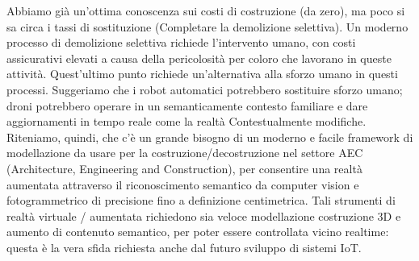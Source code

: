 Abbiamo già un'ottima conoscenza sui costi di costruzione (da zero), ma poco si sa circa i tassi di sostituzione
(Completare la demolizione selettiva). Un moderno processo di demolizione selettiva richiede l'intervento umano,
con costi assicurativi elevati a causa della pericolosità per coloro che lavorano in queste attività.
Quest'ultimo punto richiede un'alternativa alla sforzo umano in questi processi. Suggeriamo che i robot automatici
potrebbero sostituire sforzo umano; droni potrebbero operare in un semanticamente
contesto familiare e dare aggiornamenti in tempo reale come la realtà Contestualmente modifiche.
Riteniamo, quindi, che c'è un grande bisogno di un moderno e facile framework di modellazione da usare per la
costruzione/decostruzione nel settore AEC (Architecture, Engineering and Construction),
per consentire una realtà aumentata attraverso il riconoscimento semantico da computer vision e
fotogrammetrico di precisione fino a definizione centimetrica.
Tali strumenti di realtà virtuale / aumentata
richiedono sia veloce modellazione costruzione 3D e aumento di contenuto semantico, per poter essere controllata vicino
realtime: questa è la vera sfida richiesta anche dal futuro sviluppo di sistemi IoT.


